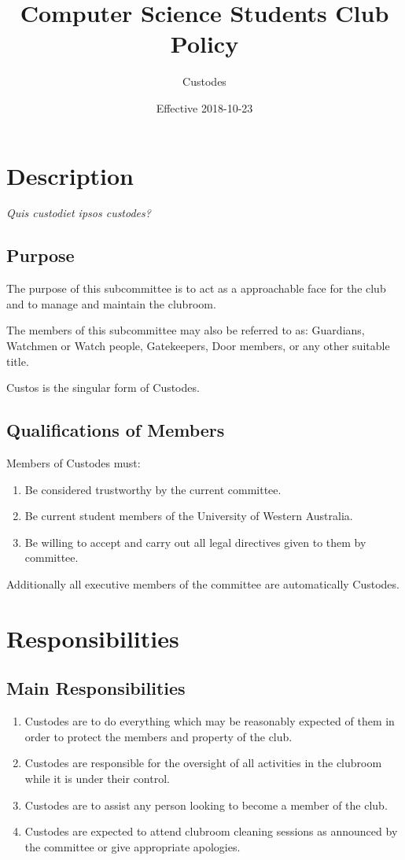 \documentclass[10pt,a4paper]{report}
\title{Computer Science Students Club Policy}
\author{Custodes}
\date{Effective 2018-10-23}
\begin{document}
	\maketitle
	\newpage
	\begin{small}
		\tableofcontents
	\end{small}
	\newpage
	\chapter{Description}
		\large{\textit{Quis custodiet ipsos custodes?}}
		\section{Purpose}
			The purpose of this subcommittee is to act as a approachable face for the club and to manage and maintain the clubroom.
			
			The members of this subcommittee may also be referred to as: Guardians, Watchmen or Watch people, Gatekeepers, Door members, or any other suitable title.
			
			Custos is the singular form of Custodes.
		\section{Qualifications of Members}
			Members of Custodes must:
			\begin{enumerate}
				\item Be considered trustworthy by the current committee.
				\item Be current student members of the University of Western Australia.
				\item Be willing to accept and carry out all legal directives given to them by committee.
			\end{enumerate}
			Additionally all executive members of the committee are automatically Custodes.
	\chapter{Responsibilities}
		\section{Main Responsibilities}
		\begin{enumerate}
			\item Custodes are to do everything which may be reasonably expected of them in order to protect the members and property of the club.
			\item Custodes are responsible for the oversight of all activities in the clubroom while it is under their control.
			\item Custodes are to assist any person looking to become a member of the club.
			\item Custodes are expected to attend clubroom cleaning sessions as announced by the committee or give appropriate apologies.
		\end{enumerate}
\end{document}
